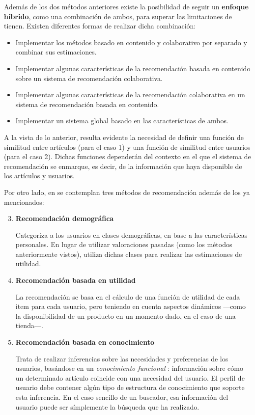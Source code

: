 Además de los dos métodos anteriores existe la posibilidad de seguir un {\bf enfoque híbrido}, como una combinación de ambos, para superar las limitaciones de tienen. Existen diferentes formas de realizar dicha combinación:

\begin{itemize}
\item Implementar los métodos basado en contenido y colaborativo por separado y combinar sus estimaciones.
\item Implementar algunas características de la recomendación basada en contenido sobre un sistema de recomendación colaborativa.
\item Implementar algunas características de la recomendación colaborativa en un sistema de recomendación basada en contenido.
\item Implementar un sistema global basado en las características de ambos.
\end{itemize}

A la vista de lo anterior, resulta evidente la necesidad de definir una función de similitud entre artículos (para el caso 1) y una función de similitud entre usuarios (para el caso 2). Dichas funciones dependerán del contexto en el que el sistema de recomendación se enmarque, es decir, de la información que haya disponible de los artículos y usuarios.

Por otro lado, en \cite{burke} se contemplan tres métodos de recomendación además de los ya mencionados:

\begin{enumerate}
\setcounter{enumi}{2}

\item {\bf Recomendación demográfica}

Categoriza a los usuarios en clases demográficas, en base a las características personales. En lugar de utilizar valoraciones pasadas (como los métodos anteriormente vistos), utiliza dichas clases para realizar las estimaciones de utilidad.

\item {\bf Recomendación basada en utilidad}

La recomendación se basa en el cálculo de una función de utilidad de cada item para cada usuario, pero teniendo en cuenta aspectos dinámicos ---como la disponibilidad de un producto en un momento dado, en el caso de una tienda---.

\item {\bf Recomendación basada en conocimiento}

Trata de realizar inferencias sobre las necesidades y preferencias de los usuarios, basándose en un {\it conocimiento funcional} \cite{burke}: información sobre cómo un determinado artículo coincide con una necesidad del usuario. El perfil de usuario debe contener algún tipo de estructura de conocimiento que soporte esta inferencia. En el caso sencillo de un buscador, esa información del usuario puede ser símplemente la búsqueda que ha realizado.

\end{enumerate}

